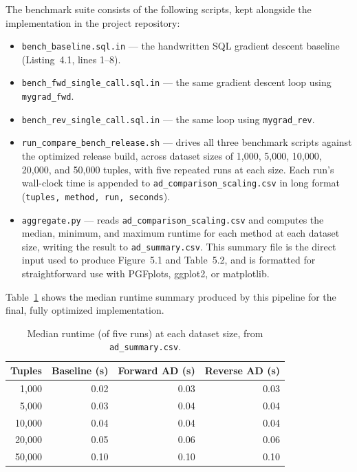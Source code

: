 \documentclass[12pt]{report}
\begin{document}
The benchmark suite consists of the following scripts, kept alongside the
implementation in the project repository:

\begin{itemize}
    \item \texttt{bench\_baseline.sql.in} --- the handwritten SQL gradient
    descent baseline (Listing~4.1, lines 1--8).
    \item \texttt{bench\_fwd\_single\_call.sql.in} --- the same gradient
    descent loop using \texttt{mygrad\_fwd}.
    \item \texttt{bench\_rev\_single\_call.sql.in} --- the same loop using
    \texttt{mygrad\_rev}.
    \item \texttt{run\_compare\_bench\_release.sh} --- drives all three
    benchmark scripts against the optimized release build, across dataset
    sizes of 1{,}000, 5{,}000, 10{,}000, 20{,}000, and 50{,}000 tuples, with
    five repeated runs at each size. Each run's wall-clock time is appended
    to \texttt{ad\_comparison\_scaling.csv} in long format
    (\texttt{tuples, method, run, seconds}).
    \item \texttt{aggregate.py} --- reads
    \texttt{ad\_comparison\_scaling.csv} and computes the median, minimum,
    and maximum runtime for each method at each dataset size, writing the
    result to \texttt{ad\_summary.csv}. This summary file is the direct input
    used to produce Figure~5.1 and Table~5.2, and is formatted for
    straightforward use with PGFplots, ggplot2, or matplotlib.
\end{itemize}

Table~\ref{tab:benchmark-summary} shows the median runtime summary produced
by this pipeline for the final, fully optimized implementation.

\begin{table}[h]
\centering
\begin{tabular}{r|rrr}
Tuples & Baseline (s) & Forward AD (s) & Reverse AD (s) \\
\hline
1,000 & 0.02 & 0.03 & 0.03 \\
5,000 & 0.03 & 0.04 & 0.04 \\
10,000 & 0.04 & 0.04 & 0.04 \\
20,000 & 0.05 & 0.06 & 0.06 \\
50,000 & 0.10 & 0.10 & 0.10 \\
\end{tabular}
\caption{Median runtime (of five runs) at each dataset size, from
\texttt{ad\_summary.csv}.}
\label{tab:benchmark-summary}
\end{table}
\end{document}
